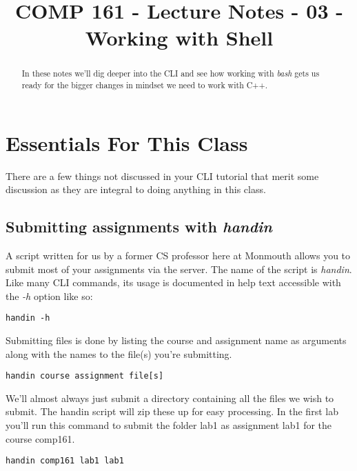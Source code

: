 \documentclass[]{tufte-handout}
\title{COMP 161 - Lecture Notes - 03 - Working with Shell}
\begin{document}
\maketitle

\begin{abstract}
In these notes we'll dig deeper into the CLI and see how working with \textit{bash} gets us ready for the bigger changes in mindset we need to work with C++. 
\end{abstract}

\section{Essentials For This Class}

There are a few things not discussed in your CLI tutorial that merit some discussion as they are integral to doing anything in this class. 

\subsection{Submitting assignments with \textit{handin}}

A script written for us by a former CS professor here at Monmouth allows you to submit most of your assignments via the server. The name of the script is \textit{handin}.  Like many CLI commands, its usage is documented in help text accessible with the \textit{-h} option like so:

\begin{verbatim}
handin -h
\end{verbatim}

Submitting files is done by listing the course and assignment name as arguments along with the names to the file(s) you're submitting. 

\begin{verbatim}
handin course assignment file[s]
\end{verbatim}

We'll almost always just submit a directory containing all the files we wish to submit. The handin script will zip these up for easy processing. In the first lab you'll run this command to submit the folder lab1 as assignment lab1 for the course comp161.

\begin{verbatim}
handin comp161 lab1 lab1
\end{verbatim}
\end{document}
